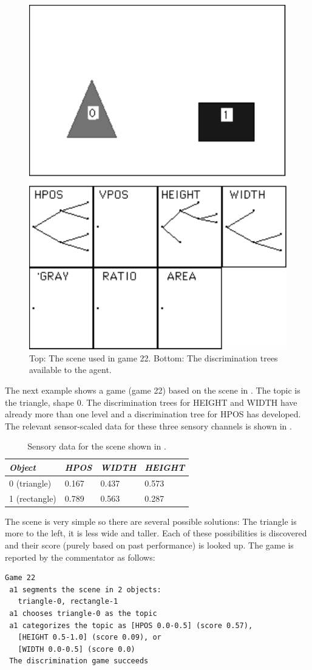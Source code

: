 \begin{figure}[htbp]
  \centerline{\includegraphics[width=.40\textwidth]{chap4/figs/scene22}}
\caption{\label{scene3} Top: The scene used in game 22. 
Bottom: The discrimination trees available to the
agent.}
\end{figure}
The next example shows a game (game 22) based on the scene 
in . The topic is the triangle, shape 0. 
The discrimination trees for 
HEIGHT and WIDTH have already more than one level and 
a discrimination tree for HPOS has developed.
The relevant sensor-scaled data for these three sensory
channels is shown in . 
\begin{table}
\begin{center}
\begin{tabular}{ l  l  l  l } \hline
{\it Object} & {\it HPOS} & {\it WIDTH} & {\it HEIGHT} \\ \hline
0 (triangle) & 0.167 & 0.437 & 0.573  \\ \hline
1 (rectangle) & 0.789 & 0.563 & 0.287 \\ \hline 
\end{tabular}
\caption{\label{tab:t-game22} Sensory data for the scene shown in .}
\end{center}
\end{table}

The scene is very simple so there are several possible
solutions: The triangle is more to the left, it is less wide 
and taller. Each of these possibilities is discovered
and their score (purely based on past performance) is 
looked up. The game is reported by the commentator
as follows: 
\begin{verbatim}
Game 22
 a1 segments the scene in 2 objects:  
   triangle-0, rectangle-1
 a1 chooses triangle-0 as the topic 
 a1 categorizes the topic as [HPOS 0.0-0.5] (score 0.57), 
   [HEIGHT 0.5-1.0] (score 0.09), or 
   [WIDTH 0.0-0.5] (score 0.0) 
 The discrimination game succeeds
\end{verbatim}

